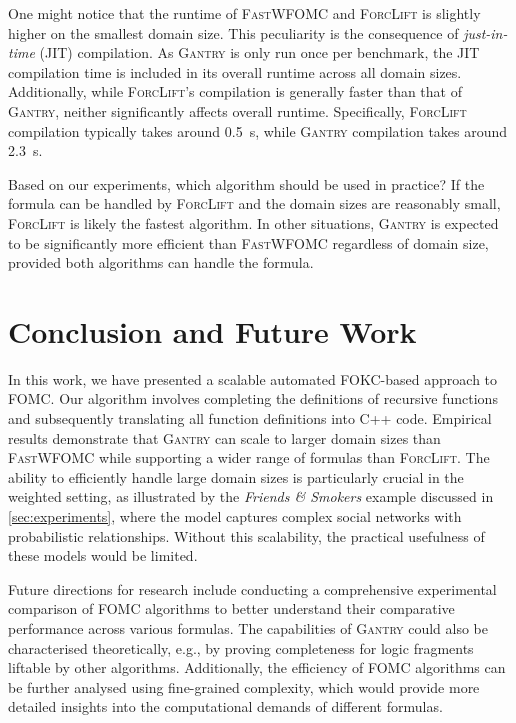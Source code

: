 \documentclass[a4paper,UKenglish,cleveref, autoref, thm-restate]{lipics-v2021}
\newcommand{\Cranetwo}{\textsc{Gantry}}
\newcommand{\friends}{\emph{Friends \& Smokers}}
\begin{document}
One might notice that the runtime of \textsc{FastWFOMC} and \textsc{ForcLift} is
slightly higher on the smallest domain size. This peculiarity is the consequence
of \emph{just-in-time} (JIT) compilation. As \Cranetwo{} is only run once per
benchmark, the JIT compilation time is included in its overall runtime across
all domain sizes. Additionally, while \textsc{ForcLift}'s compilation is
generally faster than that of \Cranetwo{}, neither significantly affects overall
runtime. Specifically, \textsc{ForcLift} compilation typically takes around
\SI{0.5}{\second}, while \Cranetwo{} compilation takes around \SI{2.3}{\second}.

Based on our experiments, which algorithm should be used in practice? If the
formula can be handled by \textsc{ForcLift} and the domain sizes are reasonably
small, \textsc{ForcLift} is likely the fastest algorithm. In other situations,
\Cranetwo{} is expected to be significantly more efficient than
\textsc{FastWFOMC} regardless of domain size, provided both algorithms can
handle the formula.

\section{Conclusion and Future Work}\label{sec:conclusion}

In this work, we have presented a scalable automated FOKC-based approach to
FOMC\@. Our algorithm involves completing the definitions of recursive functions
and subsequently translating all function definitions into C++ code. Empirical
results demonstrate that \Cranetwo{} can scale to larger domain sizes than
\textsc{FastWFOMC} while supporting a wider range of formulas than
\textsc{ForcLift}. The ability to efficiently handle large domain sizes is
particularly crucial in the weighted setting, as illustrated by the \friends{}
example discussed in \cref{sec:experiments}, where the model captures complex
social networks with probabilistic relationships. Without this scalability, the
practical usefulness of these models would be limited.

Future directions for research include conducting a comprehensive experimental
comparison of FOMC algorithms to better understand their comparative performance
across various formulas. The capabilities of \Cranetwo{} could also be
characterised theoretically, e.g., by proving completeness for logic fragments
liftable by other algorithms. Additionally, the efficiency of FOMC algorithms
can be further analysed using fine-grained complexity, which would provide more
detailed insights into the computational demands of different formulas.



\end{document}
